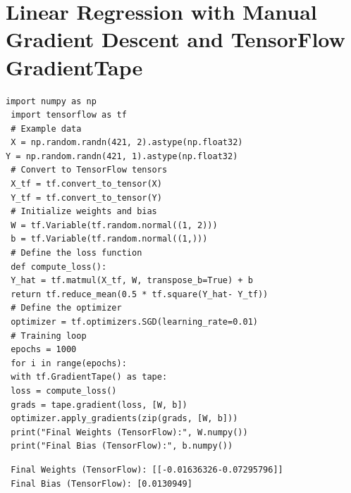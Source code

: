 \section{Linear Regression with Manual Gradient Descent and TensorFlow GradientTape}
\begin{code}
\begin{lstlisting}
import numpy as np
 import tensorflow as tf
 # Example data
 X = np.random.randn(421, 2).astype(np.float32)
Y = np.random.randn(421, 1).astype(np.float32)
 # Convert to TensorFlow tensors
 X_tf = tf.convert_to_tensor(X)
 Y_tf = tf.convert_to_tensor(Y)
 # Initialize weights and bias
 W = tf.Variable(tf.random.normal((1, 2)))
 b = tf.Variable(tf.random.normal((1,)))
 # Define the loss function
 def compute_loss():
 Y_hat = tf.matmul(X_tf, W, transpose_b=True) + b
 return tf.reduce_mean(0.5 * tf.square(Y_hat- Y_tf))
 # Define the optimizer
 optimizer = tf.optimizers.SGD(learning_rate=0.01)
 # Training loop
 epochs = 1000
 for i in range(epochs):
 with tf.GradientTape() as tape:
 loss = compute_loss()
 grads = tape.gradient(loss, [W, b])
 optimizer.apply_gradients(zip(grads, [W, b]))
 print("Final Weights (TensorFlow):", W.numpy())
 print("Final Bias (TensorFlow):", b.numpy())
\end{lstlisting}
\end{code}
\begin{verbatim}
 Final Weights (TensorFlow): [[-0.01636326-0.07295796]]
 Final Bias (TensorFlow): [0.0130949]
\end{verbatim}
